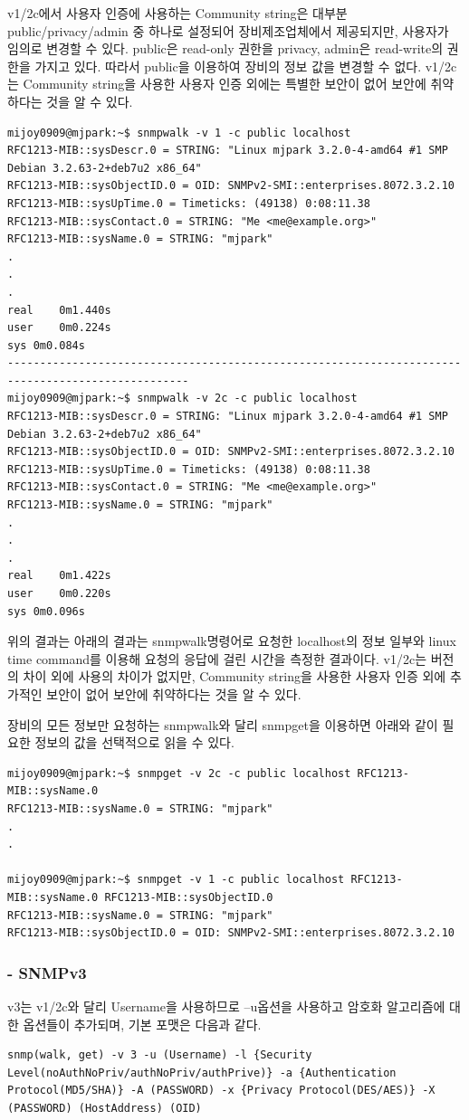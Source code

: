 \documentclass[11pt
  , a4paper
  , article
  , oneside
]{memoir}
\begin{document}
v1/2c에서 사용자 인증에 사용하는 Community string은 대부분 public/privacy/admin 중 하나로 설정되어 장비제조업체에서 제공되지만, 사용자가 임의로 변경할 수 있다. public은 read-only 권한을 privacy, admin은 read-write의 권한을 가지고 있다. 따라서 public을 이용하여 장비의 정보 값을 변경할 수 없다. v1/2c는 Community string을 사용한 사용자 인증 외에는 특별한 보안이 없어 보안에 취약하다는 것을 알 수 있다. 
\begin{lstlisting}[style=termstyle]
mijoy0909@mjpark:~$ snmpwalk -v 1 -c public localhost
RFC1213-MIB::sysDescr.0 = STRING: "Linux mjpark 3.2.0-4-amd64 #1 SMP Debian 3.2.63-2+deb7u2 x86_64"
RFC1213-MIB::sysObjectID.0 = OID: SNMPv2-SMI::enterprises.8072.3.2.10
RFC1213-MIB::sysUpTime.0 = Timeticks: (49138) 0:08:11.38
RFC1213-MIB::sysContact.0 = STRING: "Me <me@example.org>"
RFC1213-MIB::sysName.0 = STRING: "mjpark"
.
.
.
real	0m1.440s
user	0m0.224s
sys	0m0.084s
--------------------------------------------------------------------------------------------------
mijoy0909@mjpark:~$ snmpwalk -v 2c -c public localhost
RFC1213-MIB::sysDescr.0 = STRING: "Linux mjpark 3.2.0-4-amd64 #1 SMP Debian 3.2.63-2+deb7u2 x86_64"
RFC1213-MIB::sysObjectID.0 = OID: SNMPv2-SMI::enterprises.8072.3.2.10
RFC1213-MIB::sysUpTime.0 = Timeticks: (49138) 0:08:11.38
RFC1213-MIB::sysContact.0 = STRING: "Me <me@example.org>"
RFC1213-MIB::sysName.0 = STRING: "mjpark"
.
.
.
real	0m1.422s
user	0m0.220s
sys	0m0.096s
\end{lstlisting}

위의 결과는 아래의 결과는 snmpwalk명령어로 요청한 localhost의 정보 일부와 linux time command를 이용해 요청의 응답에 걸린 시간을 측정한 결과이다. v1/2c는 버전의 차이 외에 사용의 차이가 없지만, Community string을 사용한 사용자 인증 외에 추가적인 보안이 없어 보안에 취약하다는 것을 알 수 있다.


장비의 모든 정보만 요청하는 snmpwalk와 달리 snmpget을 이용하면 아래와 같이 필요한 정보의 값을 선택적으로 읽을 수 있다.
\begin{lstlisting}[style=termstyle]
mijoy0909@mjpark:~$ snmpget -v 2c -c public localhost RFC1213-MIB::sysName.0
RFC1213-MIB::sysName.0 = STRING: "mjpark"
.
.

mijoy0909@mjpark:~$ snmpget -v 1 -c public localhost RFC1213-MIB::sysName.0 RFC1213-MIB::sysObjectID.0
RFC1213-MIB::sysName.0 = STRING: "mjpark"
RFC1213-MIB::sysObjectID.0 = OID: SNMPv2-SMI::enterprises.8072.3.2.10
\end{lstlisting}


\subsubsection{- SNMPv3}
v3는 v1/2c와 달리 Username을 사용하므로 –u옵션을 사용하고 암호화 알고리즘에 대한 옵션들이 추가되며, 기본 포맷은 다음과 같다.
\begin{lstlisting}[style=termstyle]
snmp(walk, get) -v 3 -u (Username) -l {Security Level(noAuthNoPriv/authNoPriv/authPrive)} -a {Authentication Protocol(MD5/SHA)} -A (PASSWORD) -x {Privacy Protocol(DES/AES)} -X (PASSWORD) (HostAddress) (OID) 
\end{lstlisting}
\end{document}
